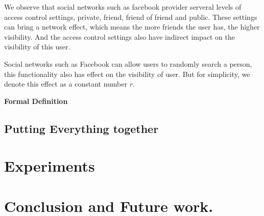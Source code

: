 \documentclass[a4paper]{article}
\begin{document}
We observe that social networks such as facebook provider serveral
levels of access control settings, private, friend, friend of friend
and public. These settings can bring a network
effect, which means the more friends the user
has, the higher visibility. And the access control settings also have
indirect impact on the visibility of this user. 

Social networks such as Facebook can allow users to randomly search a
person, this functionality also has effect on the visibility of
user. But for simplicity, we denote this effect as a constant number
$r$. 

\textbf{Formal Definition}

\subsection{Putting Everything together}

\section{Experiments}

\section{Conclusion and Future work.}



\end{document}
